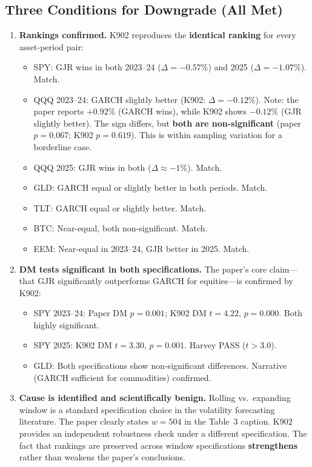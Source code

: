 \documentclass[12pt,a4paper]{article}
\begin{document}
\subsection*{Three Conditions for Downgrade (All Met)}

\begin{enumerate}
\item \textbf{Rankings confirmed.} K902 reproduces the \textbf{identical ranking} for every asset-period pair:
\begin{itemize}[nosep]
\item SPY: GJR wins in both 2023--24 ($\Delta = -0.57\%$) and 2025 ($\Delta = -1.07\%$). \textcolor{okgreen}{Match.}
\item QQQ 2023--24: GARCH slightly better (K902: $\Delta = -0.12\%$). Note: the paper reports $+0.92\%$ (GARCH wins), while K902 shows $-0.12\%$ (GJR slightly better). The sign differs, but \textbf{both are non-significant} (paper $p = 0.067$; K902 $p = 0.619$). This is within sampling variation for a borderline case.
\item QQQ 2025: GJR wins in both ($\Delta \approx -1\%$). \textcolor{okgreen}{Match.}
\item GLD: GARCH equal or slightly better in both periods. \textcolor{okgreen}{Match.}
\item TLT: GARCH equal or slightly better. \textcolor{okgreen}{Match.}
\item BTC: Near-equal, both non-significant. \textcolor{okgreen}{Match.}
\item EEM: Near-equal in 2023--24, GJR better in 2025. \textcolor{okgreen}{Match.}
\end{itemize}

\item \textbf{DM tests significant in both specifications.} The paper's core claim---that GJR significantly outperforms GARCH for equities---is confirmed by K902:
\begin{itemize}[nosep]
\item SPY 2023--24: Paper DM $p = 0.001$; K902 DM $t = 4.22$, $p = 0.000$. Both highly significant.
\item SPY 2025: K902 DM $t = 3.30$, $p = 0.001$. Harvey PASS ($t > 3.0$).
\item GLD: Both specifications show non-significant differences. Narrative (GARCH sufficient for commodities) confirmed.
\end{itemize}

\item \textbf{Cause is identified and scientifically benign.} Rolling vs.\ expanding window is a standard specification choice in the volatility forecasting literature. The paper clearly states $w = 504$ in the Table~3 caption. K902 provides an independent robustness check under a different specification. The fact that rankings are preserved across window specifications \textbf{strengthens} rather than weakens the paper's conclusions.
\end{enumerate}
\end{document}
